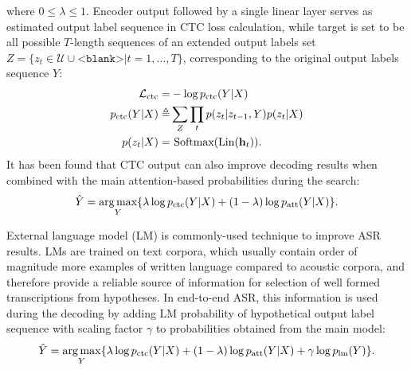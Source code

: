 \documentclass[12pt,a4paper]{article}
\DeclareMathOperator*{\argmax}{arg\,max}
\begin{document}
where $0 \leq \lambda \leq 1$.
Encoder output followed by a single linear layer serves as estimated
output label sequence in CTC loss calculation, while target is set to be
all possible $T$-length sequences of an extended output labels set
$Z = \{ z_t \in \mathcal{U} \cup \texttt{<blank>} | t = 1, \dots, T \}$,
corresponding to the original output labels sequence $Y$:
\begin{align}
\mathcal{L}_{\text{ctc}} = & - \log \mathnormal{p}_{\text{ctc}}(Y|X) \\
\mathnormal{p}_{\text{ctc}}(Y|X)  \triangleq & \sum_Z \prod_t \mathnormal{p}(z_t | z_{t-1}, Y) \mathnormal{p}(z_t | X) \\
\mathnormal{p}(z_t | X) = & \text{ Softmax}(\text{Lin}(\mathbf{h}_t) ).
\end{align}
It has been found that CTC output can also improve decoding
results when combined with the main attention-based probabilities
during the search:
\begin{align}
\hat{Y} = \argmax_Y \{ \lambda \log \mathnormal{p}_{\text{ctc}}(Y|X) + (1-\lambda) \log \mathnormal{p}_{\text{att}}(Y|X) \}.
\end{align}

External language model (LM) is commonly-used
technique to improve ASR results. LMs are trained on text corpora,
which usually contain order of magnitude more examples of written language
compared to acoustic corpora, and therefore provide a reliable source of
information for selection of well formed transcriptions from hypotheses.
In end-to-end ASR, this information is used during
the decoding by adding LM probability of hypothetical output label sequence
with scaling factor $\gamma$
to probabilities obtained from the main model:
\begin{align}
\hat{Y} = \argmax_Y \{ \lambda \log \mathnormal{p}_{\text{ctc}}(Y|X) + 
    (1-\lambda) \log \mathnormal{p}_{\text{att}}(Y|X) + \gamma \log \mathnormal{p}_{\text{lm}}(Y) \}.
\end{align}
\end{document}
